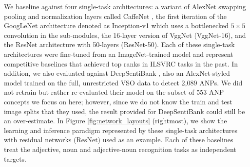 \documentclass{sig-alternate-05-2015}
\begin{document}
We baseline against four single-task architectures: a variant of AlexNet \cite{krizhevsky_2012} swapping pooling and normalization layers called CaffeNet \cite{jia_2014}, the first iteration of the GoogLeNet architecture \cite{szegedy_2015} denoted as Inception-v1 which uses a bottlenecked $5\times5$ convolution in the sub-modules, the 16-layer version of VggNet \cite{simonyan_2015} (VggNet-16), and the ResNet architecture \cite{he_2016} with 50-layers (ResNet-50).
Each of these single-task architectures were fine-tuned from an ImageNet-trained model and represent competitive baselines that achieved top ranks in ILSVRC tasks in the past.
In addition, we also evaluated against DeepSentiBank \cite{chen_2014}, also an AlexNet-styled model trained on the full, unrestricted VSO data \cite{borth_2013} to detect 2,089 ANPs.
We did not retrain \cite{chen_2014} but rather re-evaluated their model on the subset of 553 ANP concepts we focus on here; however, since we do not know the train and test image splits that they used, the result provided for DeepSentiBank \cite{chen_2014} could still be an over-estimate.
In Figure \ref{fig:network_layouts} (rightmost), we show the learning and inference paradigm represented by these single-task architectures with residual networks (ResNet) used as an example.
Each of these baselines treat the adjective, noun and adjective-noun recognition tasks as independent targets.
\end{document}
